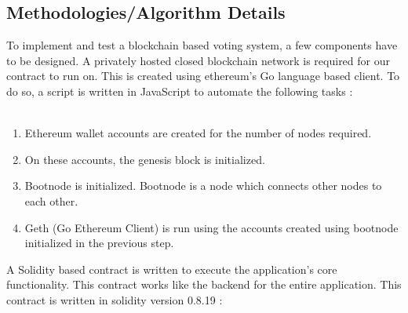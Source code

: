 \documentclass[oneside, 12pt]{book}
\begin{document}
\subsection{Methodologies/Algorithm Details}
To implement and test a blockchain based voting system, a few components have to be designed. A privately hosted closed blockchain network is required for our contract to run on. This is created using ethereum’s Go language based client. To do so, a script is written in JavaScript to automate the following tasks :
\\\\\colorbox{gray!20}{%
	\begin{minipage}{\linewidth}%
		\vspace*{2pt}
		\begin{enumerate}
			\item Ethereum wallet accounts are created for the number of nodes required.
			\item On these accounts, the genesis block is initialized.
			\item Bootnode is initialized. Bootnode is a node which connects other nodes to each other.
			\item Geth (Go Ethereum Client) is run using the accounts created using bootnode initialized in the previous step.
		\end{enumerate}
		\vspace*{2pt}
	\end{minipage}%
}
\newpage
A Solidity based contract is written to execute the application’s core functionality. This contract works like the backend for the entire application. This contract is written in solidity version 0.8.19 :
\end{document}
